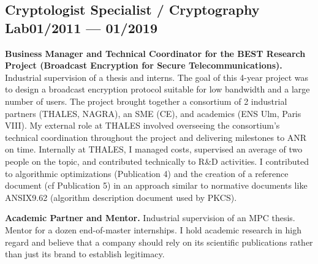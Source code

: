 \subsection{{Cryptologist Specialist / Cryptography Lab\hfill 01/2011 --- 01/2019}}
\begin{zitemize}
\item {\bf Business Manager and Technical Coordinator for the BEST Research Project (Broadcast Encryption for Secure Telecommunications).}  Industrial supervision of a thesis and interns. The goal of this 4-year project was to design a broadcast encryption protocol suitable for low bandwidth and a large number of users. The project brought together a consortium of 2 industrial partners (THALES, NAGRA), an SME (CE), and academics (ENS Ulm, Paris VIII). My external role at THALES involved overseeing the consortium's technical coordination throughout the project and delivering milestones to ANR on time. Internally at THALES, I managed costs, supervised an average of two people on the topic, and contributed technically to R\&D activities. I contributed to algorithmic optimizations (Publication 4) and the creation of a reference document (cf Publication 5) in an approach similar to normative documents like ANSIX9.62 (algorithm description document used by PKCS).
 
\item {\bf Academic Partner and Mentor.} Industrial supervision of an MPC thesis. Mentor for a dozen end-of-master internships. I hold academic research in high regard and believe that a company should rely on its scientific publications rather than just its brand to establish legitimacy.
\end{zitemize}



